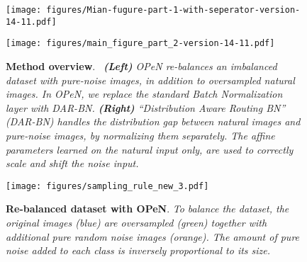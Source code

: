 \documentclass[nohyperref]{article}
\theoremstyle{plain}
\theoremstyle{definition}
\theoremstyle{remark}
\begin{document}
\begin{figure*}[t]
\vspace*{-0.2cm}
    \centering
    \begin{minipage}[c]{0.68\linewidth}
    \texttt{[image: figures/Mian-fugure-part-1-with-seperator-version-14-11.pdf]}
    \end{minipage}
     \hfill
    \begin{minipage}[c]{0.30\linewidth}
    \texttt{[image: figures/main\_figure\_part\_2-version-14-11.pdf]}
    \end{minipage}
    \vspace*{-0.3cm}
    {\caption{\textbf{Method overview}. \  {\it \textbf{(Left)} 
    OPeN re-balances an imbalanced dataset with pure-noise images, in addition to oversampled natural images. In OPeN, we replace the standard Batch Normalization layer with DAR-BN. \textbf{(Right)}  ``Distribution Aware Routing BN'' (DAR-BN) handles the distribution gap between  natural images and pure-noise images, by normalizing them separately. The affine parameters learned on the natural input only, are used to correctly scale and shift the noise input.}}    \label{fig:methodOverview}}
    \vspace*{-0.5cm}

\end{figure*}


\begin{figure}
  \begin{minipage}[c]{0.47\columnwidth}
    \texttt{[image: figures/sampling\_rule\_new\_3.pdf]}
  \end{minipage}\hfill
  \begin{minipage}[c]{0.47\columnwidth} 
    \vspace*{-0.6cm}
    \caption{\textbf{Re-balanced dataset with OPeN}. {\it To balance the dataset, the original images (blue) are oversampled (green) together with additional pure random noise images (orange). The amount of pure noise added to each class is inversely proportional to its size. 
    }
\label{fig:rebalanced_dataset}
    } 
  \end{minipage}
  \vspace*{-0.8cm}
\end{figure}
\end{document}
